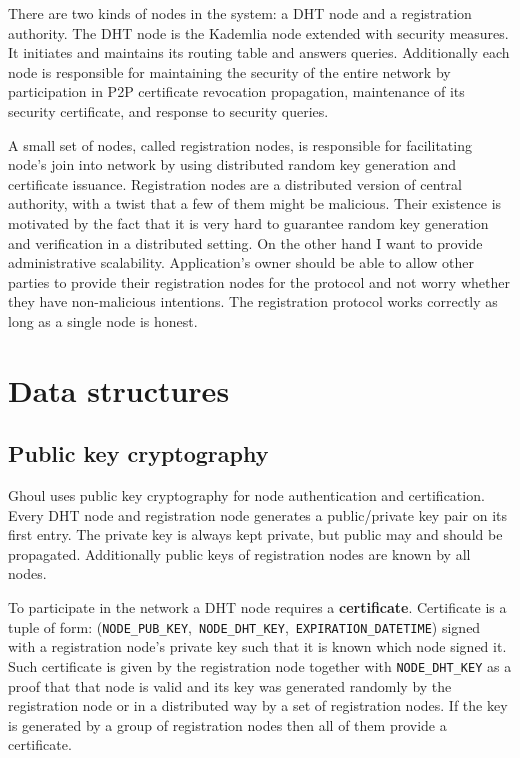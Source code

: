 There are two kinds of nodes in the system: a DHT node and a registration
authority. The DHT node is the Kademlia node extended with security measures.
It initiates and maintains its routing table and answers queries. Additionally
each node is responsible for maintaining the security of the entire network by
participation in P2P certificate revocation propagation, maintenance of its
security certificate, and response to security queries.

A small set of nodes, called registration nodes, is responsible for facilitating
node’s join into network by using distributed random key generation and
certificate issuance. Registration nodes are a distributed version of central
authority, with a twist that a few of them might be malicious. Their existence
is motivated by the fact that it is very hard to guarantee random key generation
and verification in a distributed setting. On the other hand I want to provide
administrative scalability. Application's owner should be able to allow other
parties to provide their registration nodes for the protocol and not worry
whether they have non-malicious intentions. The registration protocol works
correctly as long as a single node is honest.

\section{Data structures}

\subsection{Public key cryptography}
Ghoul uses public key cryptography for node authentication and certification.
Every DHT node and registration node generates a public/private key pair on its
first entry. The private key is always kept private, but public may and should
be propagated. Additionally public keys of registration nodes are known by all
nodes.

To participate in the network a DHT node requires a \textbf{certificate}.
Certificate is a tuple of form:
(\texttt{NODE\_PUB\_KEY},~\texttt{NODE\_DHT\_KEY},~\texttt{EXPIRATION\_DATETIME})
signed with a registration node's private key such that it is known which node
signed it. Such certificate is given by the registration node together with
\texttt{NODE\_DHT\_KEY} as a proof that that node is valid and its key was
generated randomly by the registration node or in a distributed way by a set of
registration nodes. If the key is generated by a group of registration nodes
then all of them provide a certificate.

